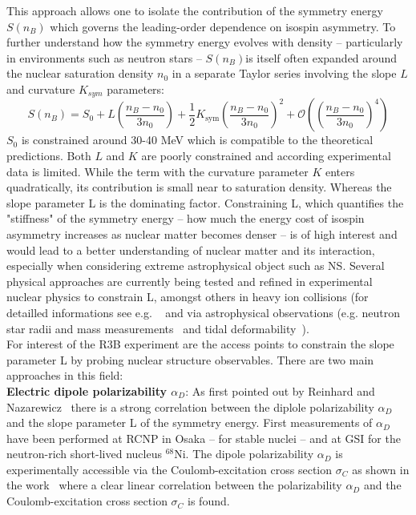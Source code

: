 This approach allows one to isolate the contribution of the symmetry energy $S(n_B)$  which governs the leading-order dependence on isospin asymmetry.\newline
To further understand how the symmetry energy evolves with density -- particularly in environments such as neutron stars -- $S(n_B) $is itself often expanded around the nuclear saturation density $n_0$ in a separate Taylor series involving the slope $L$ and curvature $K_{sym}$ parameters:
\begin{equation}
S(n_B) = S_0 + L \left( \frac{n_B - n_0}{3n_0} \right) + \frac{1}{2} K_{\text{sym}} \left( \frac{n_B - n_0}{3n_0} \right)^2 + \mathcal{O}\left(\left( \frac{n_B - n_0}{3n_0}\right)^4 \right)
\end{equation}
$S_0$ is constrained around 30-40 MeV which is compatible to the theoretical predictions. Both $L$ and $K$ are poorly constrained and according experimental data is limited. While the term with the curvature parameter $K$ enters quadratically, its contribution is small near to saturation density.\newline
Whereas the slope parameter L is the dominating factor. Constraining L, which quantifies the "stiffness" of the symmetry energy -- how much the energy cost of isospin asymmetry increases as nuclear matter becomes denser -- is of high interest and would lead to a better understanding of nuclear matter and its interaction, especially when considering extreme astrophysical object such as NS.\newline
Several physical approaches are currently being tested and refined in experimental nuclear physics to constrain L, amongst others in heavy ion collisions (for detailled informations see e.g. ~\cite{tsang2011constraints,tsang2024constraining,wang2020study,jhang2021symmetry} and via astrophysical observations (e.g. neutron star radii and mass measurements~\cite{bogdanov2021constraining,nattila2017neutron,radice2019multimessenger} and tidal deformability~\cite{hu2020effects,raithel2019measurement}).\\
For interest of the R3B experiment are the access points to constrain the slope parameter L by probing nuclear structure observables. There are two main approaches in this field:\\
\quad \textbf{Electric dipole polarizability $\alpha_D$}: As first pointed out by Reinhard and Nazarewicz~\cite{reinhard2010information} there is a strong correlation between the diplole polarizability $\alpha_D$ and the slope parameter L of the symmetry energy. First measurements of $\alpha_D$ have been performed at RCNP in Osaka -- for stable nuclei -- and at GSI for the neutron-rich short-lived nucleus $^{68}$Ni. The dipole polarizability $\alpha_D$ is experimentally accessible via the  Coulomb-excitation cross section $\sigma_C$ as shown in the work~\cite{horvat2021evolution} where a clear linear correlation between the polarizability $\alpha_D$ and the Coulomb-excitation cross section $\sigma_C$ is found.

